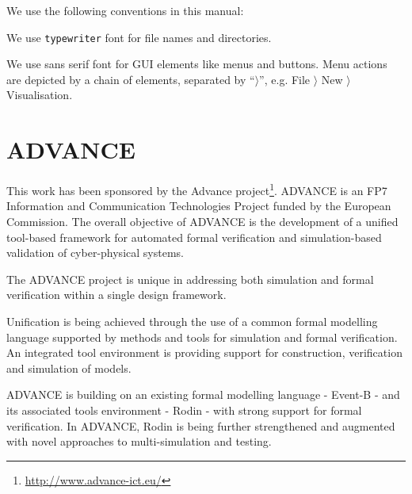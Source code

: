 \documentclass[twoside,10pt]{book}
\begin{document}
We use the following conventions in this manual:


We use \texttt{typewriter} font for file names and directories.

We use \textsf{sans serif font} for GUI elements like menus and buttons.  Menu actions are depicted by a chain of elements, separated by ``$\rangle$'', e.g. \textsf{File $\rangle$ New $\rangle$ Visualisation}.

\section{ADVANCE}
\label{advance}

This work has been sponsored by the Advance project\footnote{\url{http://www.advance-ict.eu/}}.  ADVANCE is an FP7 Information and Communication Technologies Project funded by the European Commission. The overall objective of ADVANCE is the development of a unified tool-based framework for automated formal verification and simulation-based validation of cyber-physical systems.

The ADVANCE project is unique in addressing both simulation and formal verification within a single design framework.

Unification is being achieved through the use of a common formal modelling language supported by methods and tools for simulation and formal verification. An integrated tool environment is providing support for construction, verification and simulation of models.

ADVANCE is building on an existing formal modelling language - Event-B - and its associated tools environment - Rodin - with strong support for formal verification. In ADVANCE, Rodin is being further strengthened and augmented with novel approaches to multi-simulation and testing.



% 







\clearpage
{}
{} 
\printindex
\end{document}
